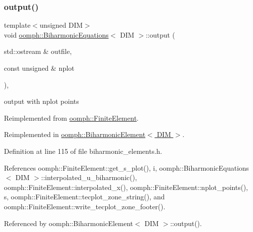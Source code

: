 \subsubsection{\texorpdfstring{output()}{output()}\hspace{0.1cm}{\footnotesize\ttfamily [1/4]}}
{\footnotesize\ttfamily template$<$unsigned D\+IM$>$ \\
void \hyperlink{classoomph_1_1BiharmonicEquations}{oomph\+::\+Biharmonic\+Equations}$<$ D\+IM $>$\+::output (\begin{DoxyParamCaption}\item[{std\+::ostream \&}]{outfile,  }\item[{const unsigned \&}]{nplot }\end{DoxyParamCaption})\hspace{0.3cm}{\ttfamily [inline]}, {\ttfamily [virtual]}}



output with nplot points 



Reimplemented from \hyperlink{classoomph_1_1FiniteElement_afa9d9b2670f999b43e6679c9dd28c457}{oomph\+::\+Finite\+Element}.



Reimplemented in \hyperlink{classoomph_1_1BiharmonicElement_ae21ebdb90932f2643157d2949093ea78}{oomph\+::\+Biharmonic\+Element$<$ D\+I\+M $>$}.



Definition at line 115 of file biharmonic\+\_\+elements.\+h.



References oomph\+::\+Finite\+Element\+::get\+\_\+s\+\_\+plot(), i, oomph\+::\+Biharmonic\+Equations$<$ D\+I\+M $>$\+::interpolated\+\_\+u\+\_\+biharmonic(), oomph\+::\+Finite\+Element\+::interpolated\+\_\+x(), oomph\+::\+Finite\+Element\+::nplot\+\_\+points(), s, oomph\+::\+Finite\+Element\+::tecplot\+\_\+zone\+\_\+string(), and oomph\+::\+Finite\+Element\+::write\+\_\+tecplot\+\_\+zone\+\_\+footer().



Referenced by oomph\+::\+Biharmonic\+Element$<$ D\+I\+M $>$\+::output().

\mbox{\label{classoomph_1_1BiharmonicEquations_a2e34f7e115f4e80d5ef6fcbed78c97d7}} 
